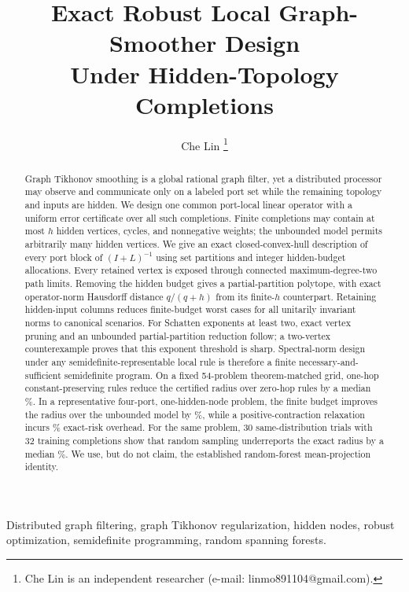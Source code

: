 \documentclass[journal,10pt]{IEEEtran}
\title{Exact Robust Local Graph-Smoother Design\\
Under Hidden-Topology Completions}
\author{Che Lin%
\thanks{Che Lin is an independent researcher (e-mail:
linmo891104@gmail.com).}}
\theoremstyle{definition}
\theoremstyle{remark}
\begin{document}
\maketitle

\begin{abstract}
Graph Tikhonov smoothing is a global rational graph filter, yet a distributed
processor may observe and communicate only on a labeled port set while the
remaining topology and inputs are hidden.  We design one common port-local
linear operator with a uniform error certificate over all such completions.
Finite completions may contain at most $h$ hidden vertices, cycles, and
nonnegative weights; the unbounded model permits arbitrarily many hidden
vertices.  We give an exact closed-convex-hull description of
every port block of $(I+L)^{-1}$ using set partitions and integer hidden-budget
allocations.  Every retained vertex is exposed through connected
maximum-degree-two path limits.  Removing
the hidden budget gives a partial-partition polytope, with exact operator-norm
Hausdorff distance $q/(q+h)$ from its finite-$h$ counterpart.  Retaining
hidden-input columns reduces finite-budget worst cases for all unitarily
invariant norms to canonical scenarios.  For Schatten exponents at
least two, exact vertex pruning and an unbounded partial-partition reduction
follow; a two-vertex counterexample proves that this exponent threshold is
sharp.  Spectral-norm design under any semidefinite-representable local rule is
therefore a finite necessary-and-sufficient semidefinite program.  On a fixed
54-problem theorem-matched grid, one-hop constant-preserving rules reduce the
certified radius over zero-hop rules by a median \OneHopMedianGainPct\%.  In a
representative four-port, one-hidden-node problem, the finite budget improves
the radius over the unbounded model by \PrincipalFiniteGainPct\%, while a
positive-contraction relaxation incurs \PrincipalPSDOverheadPct\% exact-risk
overhead.  For the same problem, 30 same-distribution trials with 32 training
completions show that random sampling
underreports the exact radius by a median
\PrincipalSampleUnderMedianPct\%.  We use, but do not claim, the established
random-forest mean-projection identity.
\end{abstract}

\begin{IEEEkeywords}
Distributed graph filtering, graph Tikhonov regularization, hidden nodes,
robust optimization, semidefinite programming, random spanning forests.
\end{IEEEkeywords}
\end{document}
